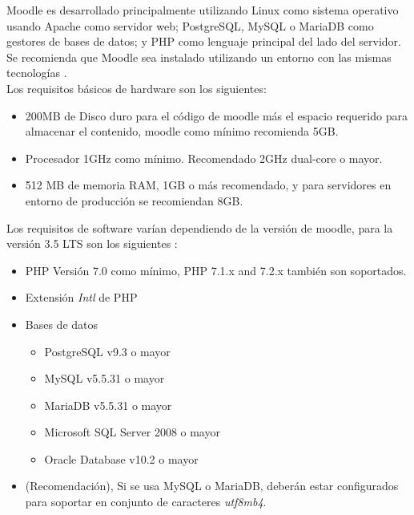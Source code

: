  Moodle es desarrollado principalmente utilizando Linux como sistema operativo usando Apache
 como servidor web; PostgreSQL, MySQL o MariaDB como gestores de bases de datos; y PHP como
 lenguaje principal del lado del servidor. Se recomienda que Moodle sea instalado utilizando
 un entorno con las mismas tecnologías \cite{moodleInstall}. \\

 \noindent Los requisitos básicos de hardware son los siguientes:

    \begin{itemize}
    \item 200MB de Disco duro para el código de moodle más el espacio requerido
          para almacenar el contenido, moodle como mínimo recomienda 5GB.

    \item Procesador 1GHz como mínimo. Recomendado 2GHz dual-core o mayor.

    \item 512 MB de memoria RAM, 1GB o más recomendado, y para servidores en entorno
          de producción se recomiendan 8GB.
    \end{itemize}

 \clearpage

 \noindent Los requisitos de software varían dependiendo de la versión de moodle, para la
 versión 3.5 LTS son los siguientes \cite{moodleReleaseNotes}:

    \begin{itemize}
        \item PHP Versión 7.0 como mínimo, PHP 7.1.x and 7.2.x también son soportados.
        \item Extensión {\it Intl} de PHP
        \item Bases de datos
            \begin{itemize}
            \item PostgreSQL v9.3 o mayor
            \item MySQL v5.5.31 o mayor
            \item MariaDB v5.5.31 o mayor
            \item Microsoft SQL Server 2008 o mayor
            \item Oracle Database v10.2 o mayor
            \end{itemize}
        \item[] (Recomendación), Si se usa MySQL o MariaDB, deberán estar configurados para soportar en conjunto de caracteres {\it utf8mb4}.
    \end{itemize}
